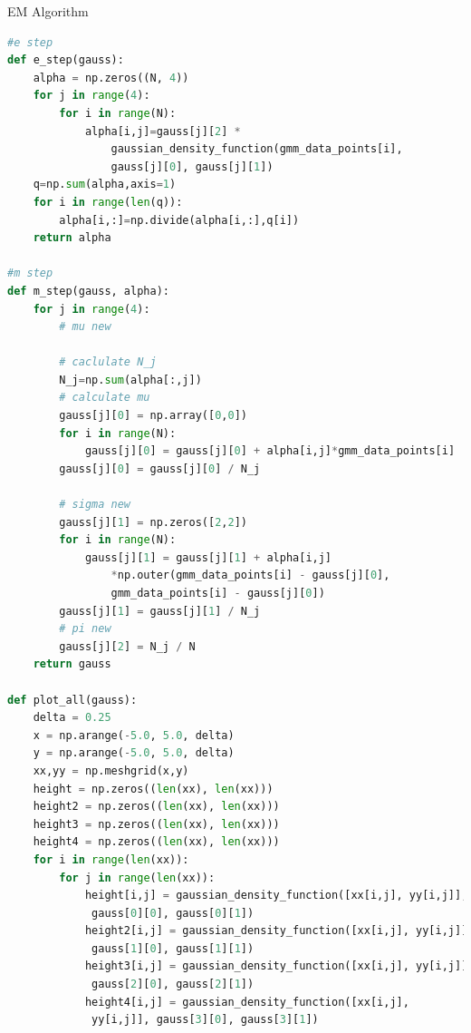 \documentclass[
ngerman,
]{tudaexercise}
\begin{document}
\begin{task}{EM Algorithm}
\begin{subtask}
\begin{lstlisting}[language=Python]
#e step
def e_step(gauss):
	alpha = np.zeros((N, 4))
	for j in range(4):
		for i in range(N):
			alpha[i,j]=gauss[j][2] *
				gaussian_density_function(gmm_data_points[i], 
				gauss[j][0], gauss[j][1])
	q=np.sum(alpha,axis=1)
	for i in range(len(q)):
		alpha[i,:]=np.divide(alpha[i,:],q[i])
	return alpha

#m step
def m_step(gauss, alpha):
	for j in range(4):
		# mu new
		
		# caclulate N_j
		N_j=np.sum(alpha[:,j])
		# calculate mu
		gauss[j][0] = np.array([0,0])
		for i in range(N):
			gauss[j][0] = gauss[j][0] + alpha[i,j]*gmm_data_points[i]
		gauss[j][0] = gauss[j][0] / N_j
		
		# sigma new
		gauss[j][1] = np.zeros([2,2])
		for i in range(N):
			gauss[j][1] = gauss[j][1] + alpha[i,j]
				*np.outer(gmm_data_points[i] - gauss[j][0],
				gmm_data_points[i] - gauss[j][0])
		gauss[j][1] = gauss[j][1] / N_j
		# pi new
		gauss[j][2] = N_j / N
	return gauss

def plot_all(gauss):
	delta = 0.25
	x = np.arange(-5.0, 5.0, delta)
	y = np.arange(-5.0, 5.0, delta)
	xx,yy = np.meshgrid(x,y)
	height = np.zeros((len(xx), len(xx)))
	height2 = np.zeros((len(xx), len(xx)))
	height3 = np.zeros((len(xx), len(xx)))
	height4 = np.zeros((len(xx), len(xx)))
	for i in range(len(xx)):
		for j in range(len(xx)):
			height[i,j] = gaussian_density_function([xx[i,j], yy[i,j]],
			 gauss[0][0], gauss[0][1])
			height2[i,j] = gaussian_density_function([xx[i,j], yy[i,j]],
			 gauss[1][0], gauss[1][1])
			height3[i,j] = gaussian_density_function([xx[i,j], yy[i,j]],
			 gauss[2][0], gauss[2][1])
			height4[i,j] = gaussian_density_function([xx[i,j],
			 yy[i,j]], gauss[3][0], gauss[3][1])
			

\end{lstlisting}
\end{subtask}
\end{task}
\end{document}
